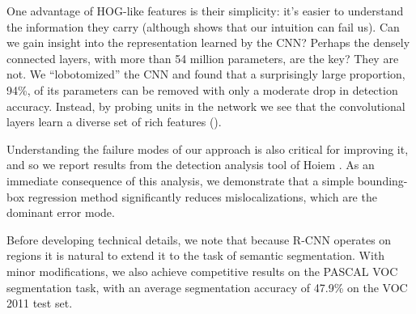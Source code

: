 One advantage of HOG-like features is their simplicity: it's easier to understand the information they carry (although \cite{vondrick2013hoggles} shows that our intuition can fail us).
Can we gain insight into the representation learned by the CNN?
Perhaps the densely connected layers, with more than 54 million parameters, are the key?
They are not. 
We ``lobotomized'' the CNN and found that a surprisingly large proportion, 94\%, of its parameters can be removed with only a moderate drop in detection accuracy.
Instead, by probing units in the network we  see that the convolutional layers learn a diverse set of rich features ().

Understanding the failure modes of our approach is also critical for improving it, and so we report results from the detection analysis tool of Hoiem \etal
\cite{hoiem2012diagnosing}.
As an immediate consequence of this analysis, we demonstrate that a simple bounding-box regression method significantly reduces mislocalizations, which are the dominant error mode.

Before developing technical details, we note that because R-CNN operates on regions it is natural to extend it to the task of semantic segmentation.
With minor modifications, we also achieve competitive results on the PASCAL VOC segmentation task, with an average segmentation accuracy of 47.9\% on the VOC 2011 test set.
